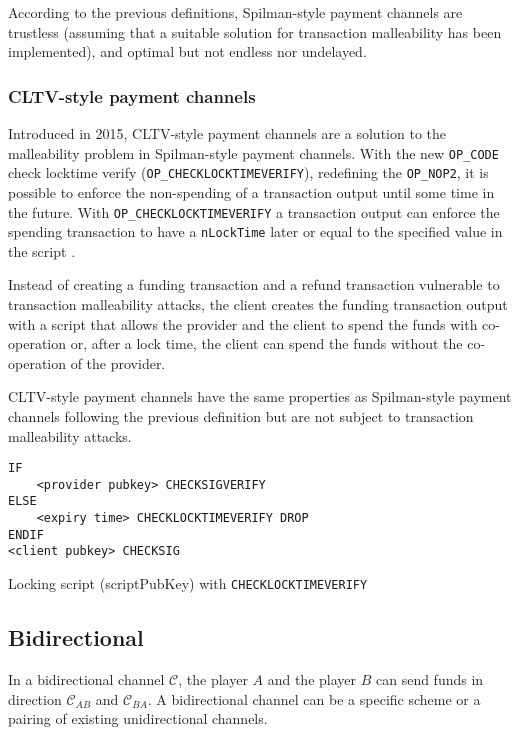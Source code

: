 According to the previous definitions, Spilman-style payment channels are
trustless (assuming that a suitable solution for transaction malleability has
been implemented), and optimal but not endless nor undelayed.

\subsubsection{CLTV-style payment channels}

Introduced in 2015, CLTV-style payment channels are a solution to the malleability
problem in Spilman-style payment channels. With the new \texttt{OP\_CODE} check
locktime verify (\texttt{OP\_CHECKLOCKTIMEVERIFY}), redefining the
\texttt{OP\_NOP2}, it is possible to enforce the non-spending of a transaction
output until some time in the future. With \texttt{OP\_CHECKLOCKTIMEVERIFY} a
transaction output can enforce the spending transaction to have a
\texttt{nLockTime} later or equal to the specified value in the script
\cite{BIP65}.

Instead of creating a funding transaction and a refund transaction vulnerable to
transaction malleability attacks, the client creates the funding transaction
output with a script that allows the provider and the client to spend the funds
with co-operation or, after a lock time, the client can spend the funds without
the co-operation of the provider.

CLTV-style payment channels have the same properties as Spilman-style payment
channels following the previous definition but are not subject to transaction
malleability attacks.

\begin{listing}
  \begin{verbatim}
IF
    <provider pubkey> CHECKSIGVERIFY
ELSE
    <expiry time> CHECKLOCKTIMEVERIFY DROP
ENDIF
<client pubkey> CHECKSIG
  \end{verbatim}
	\caption{Locking script (scriptPubKey) with \texttt{CHECKLOCKTIMEVERIFY}}
	\label{lst:scriptPubKeyCLTV}
\end{listing}

\subsection{Bidirectional}

In a bidirectional channel $\mathcal{C}$, the player $A$ and the player $B$ can
send funds in direction $\mathcal{C}_{AB}$ and $\mathcal{C}_{BA}$. A
bidirectional channel can be a specific scheme or a pairing of existing
unidirectional channels.

